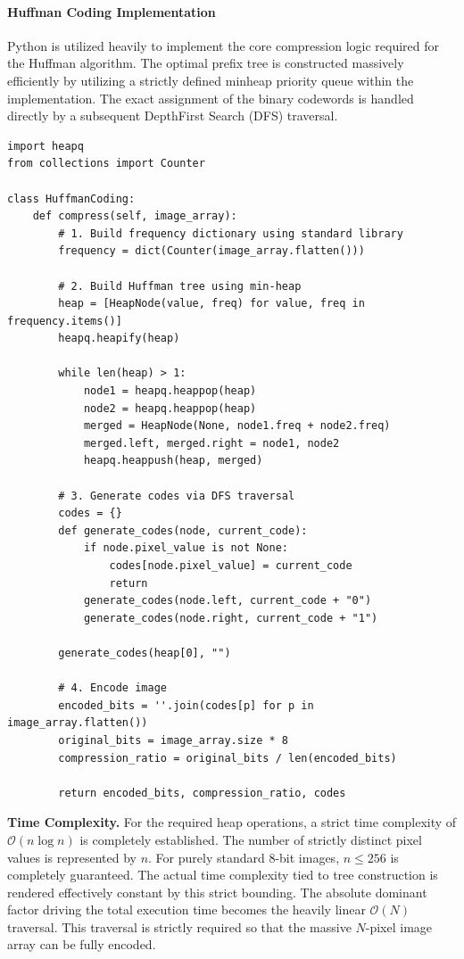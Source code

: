 \paragraph{Huffman Coding Implementation}

Python is utilized heavily to implement the core compression logic required for the Huffman algorithm. The optimal prefix tree is constructed massively efficiently by utilizing a strictly defined minheap priority queue within the implementation. The exact assignment of the binary codewords is handled directly by a subsequent DepthFirst Search (DFS) traversal.

\begin{verbatim}
import heapq
from collections import Counter

class HuffmanCoding:
    def compress(self, image_array):
        # 1. Build frequency dictionary using standard library
        frequency = dict(Counter(image_array.flatten()))
        
        # 2. Build Huffman tree using min-heap
        heap = [HeapNode(value, freq) for value, freq in frequency.items()]
        heapq.heapify(heap)
        
        while len(heap) > 1:
            node1 = heapq.heappop(heap)
            node2 = heapq.heappop(heap)
            merged = HeapNode(None, node1.freq + node2.freq)
            merged.left, merged.right = node1, node2
            heapq.heappush(heap, merged)
            
        # 3. Generate codes via DFS traversal
        codes = {}
        def generate_codes(node, current_code):
            if node.pixel_value is not None:
                codes[node.pixel_value] = current_code
                return
            generate_codes(node.left, current_code + "0")
            generate_codes(node.right, current_code + "1")
            
        generate_codes(heap[0], "")
        
        # 4. Encode image
        encoded_bits = ''.join(codes[p] for p in image_array.flatten())
        original_bits = image_array.size * 8
        compression_ratio = original_bits / len(encoded_bits)
        
        return encoded_bits, compression_ratio, codes
\end{verbatim}

\vspace{1em}
\noindent\textbf{Time Complexity.} For the required heap operations, a strict time complexity of $\mathcal{O}(n \log n)$ is completely established. The number of strictly distinct pixel values is represented by $n$. For purely standard 8-bit images, $n \leq 256$ is completely guaranteed. The actual time complexity tied to tree construction is rendered effectively constant by this strict bounding. The absolute dominant factor driving the total execution time becomes the heavily linear $\mathcal{O}(N)$ traversal. This traversal is strictly required so that the massive $N$-pixel image array can be fully encoded.


